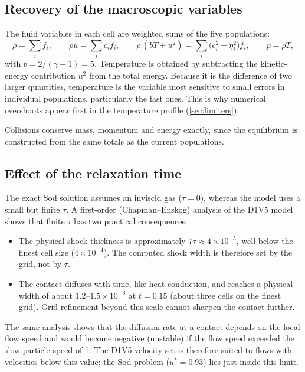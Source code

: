 \documentclass[11pt]{article}
\begin{document}
\subsection{Recovery of the macroscopic variables}
The fluid variables in each cell are weighted sums of the five populations:
\begin{equation}
\rho = \sum_i f_i, \qquad
\rho u = \sum_i c_i f_i, \qquad
\rho\,(bT + u^2) = \sum_i \bigl(c_i^2 + \eta_i^2\bigr) f_i, \qquad
p = \rho T,
\label{eq:moments}
\end{equation}
with $b = 2/(\gamma-1) = 5$.  Temperature is obtained by subtracting the kinetic-energy
contribution $u^2$ from the total energy.  Because it is the difference of two larger
quantities, temperature is the variable most sensitive to small errors in individual
populations, particularly the fast ones.  This is why numerical overshoots appear first in
the temperature profile (\cref{sec:limiters}).

Collisions conserve mass, momentum and energy exactly, since the equilibrium is
constructed from the same totals as the current populations.

\subsection{Effect of the relaxation time}
The exact Sod solution assumes an inviscid gas ($\tau = 0$), whereas the model uses a small
but finite $\tau$.  A first-order (Chapman--Enskog) analysis of the D1V5 model shows that
finite $\tau$ has two practical consequences:
\begin{itemize}
  \item The physical shock thickness is approximately $7\tau \approx 4\times10^{-5}$, well
        below the finest cell size ($4\times10^{-4}$).  The computed shock width is
        therefore set by the grid, not by $\tau$.
  \item The contact diffuses with time, like heat conduction, and reaches a physical width
        of about $1.2$--$1.5\times10^{-3}$ at $t = 0.15$ (about three cells on the finest
        grid).  Grid refinement beyond this scale cannot sharpen the contact further.
\end{itemize}
The same analysis shows that the diffusion rate at a contact depends on the local flow
speed and would become negative (unstable) if the flow speed exceeded the slow particle
speed of 1.  The D1V5 velocity set is therefore suited to flows with velocities below this
value; the Sod problem ($u^* = 0.93$) lies just inside this limit.
\end{document}
